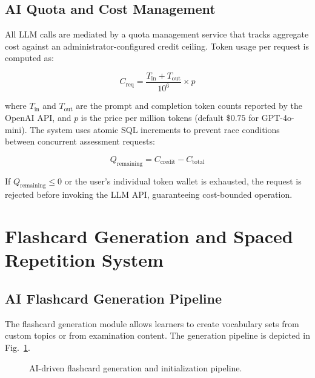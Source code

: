 \documentclass[conference]{IEEEtran}
\begin{document}
\subsection{AI Quota and Cost Management}
All LLM calls are mediated by a quota management service that tracks aggregate cost against an administrator-configured credit ceiling. Token usage per request is computed as:

\begin{equation}
C_{\text{req}} = \frac{T_{\text{in}} + T_{\text{out}}}{10^6} \times p
\label{eq:cost}
\end{equation}

where $T_{\text{in}}$ and $T_{\text{out}}$ are the prompt and completion token counts reported by the OpenAI API, and $p$ is the price per million tokens (default $\$0.75$ for GPT-4o-mini). The system uses atomic SQL increments to prevent race conditions between concurrent assessment requests:

\begin{equation}
Q_{\text{remaining}} = C_{\text{credit}} - C_{\text{total}}
\label{eq:quota}
\end{equation}

If $Q_{\text{remaining}} \leq 0$ or the user's individual token wallet is exhausted, the request is rejected before invoking the LLM API, guaranteeing cost-bounded operation.

\section{Flashcard Generation and Spaced Repetition System}

\subsection{AI Flashcard Generation Pipeline}
The flashcard generation module allows learners to create vocabulary sets from custom topics or from examination content. The generation pipeline is depicted in Fig.~\ref{fig:flashcard_pipeline}.

\begin{figure}[!t]
\centering
{}
\caption{AI-driven flashcard generation and initialization pipeline.}
\label{fig:flashcard_pipeline}
\end{figure}
\end{document}
